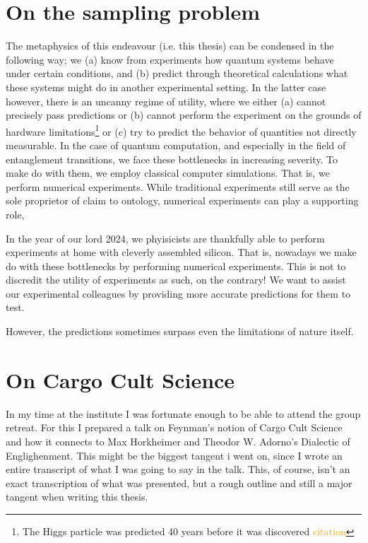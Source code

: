 \section*{On the sampling problem}

The metaphysics of this endeavour (i.e. this thesis) can
be condensed in the following way; we (a) know from experiments how quantum
systems behave under certain conditions, and (b) predict through theoretical
calculations what these systems might do in another experimental setting. In
the latter case however, there is an uncanny regime of utility, where we either
(a) cannot precisely pass predictions or (b) cannot perform the experiment on
the grounds of hardware limitations\footnote{The Higgs particle was predicted
40 years before it was discovered \textcolor{orange}{citation}} or (c) try to
predict the behavior of quantities not directly measurable. In the case of
quantum computation, and especially in the field of entanglement transitions,
we face these bottlenecks in increasing severity. To make do with them, we
employ classical computer simulations. That is, we perform numerical
experiments. While traditional experiments still serve as the sole proprietor of claim to
ontology, numerical experiments can play a supporting role, 

In the year of our
lord 2024, we phyisicists are thankfully able to perform experiments at home
with cleverly assembled silicon.  That is, nowadays we make do with these
bottlenecks by performing numerical experiments. This is not to discredit the
utility of experiments as such, on the contrary! We want to assist our
experimental colleagues by providing more accurate predictions for them to
test. 

However, the predictions sometimes surpass even the limitations of nature
itself. 

\section*{On Cargo Cult Science}
In my time at the institute I was fortunate enough to be able to attend the
group retreat. For this I prepared a talk on Feynman's notion of Cargo Cult
Science and how it connects to Max Horkheimer and Theodor W. Adorno's Dialectic
of Englighenment. This might be the biggest tangent i went on, since I wrote an
entire transcript of what I was going to say in the talk. This, of course,
isn't an exact transcription of what was presented, but a rough outline and
still a major tangent when writing this thesis.

